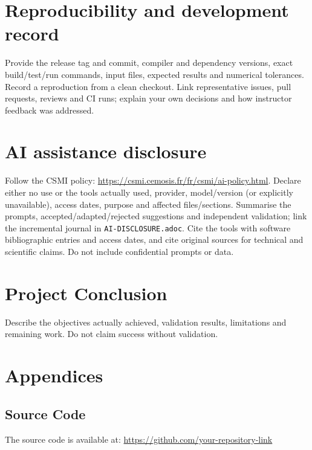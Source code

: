 \documentclass[11pt,a4paper]{article}
\begin{document}
\section{Reproducibility and development record}
Provide the release tag and commit, compiler and dependency versions, exact build/test/run commands, input files, expected results and numerical tolerances.
Record a reproduction from a clean checkout. Link representative issues, pull requests, reviews and CI runs; explain your own decisions and how instructor feedback was addressed.

\section{AI assistance disclosure}
Follow the CSMI policy: \url{https://csmi.cemosis.fr/fr/csmi/ai-policy.html}.
Declare either no use or the tools actually used, provider, model/version (or explicitly unavailable), access dates, purpose and affected files/sections.
Summarise the prompts, accepted/adapted/rejected suggestions and independent validation; link the incremental journal in \texttt{AI-DISCLOSURE.adoc}.
Cite the tools with software bibliographic entries and access dates, and cite original sources for technical and scientific claims. Do not include confidential prompts or data.

\section{Project Conclusion}
\label{sec:conclusion}
Describe the objectives actually achieved, validation results, limitations and remaining work. Do not claim success without validation.

\section*{Appendices}
\subsection*{Source Code}
The source code is available at: \url{https://github.com/your-repository-link}
\end{document}
